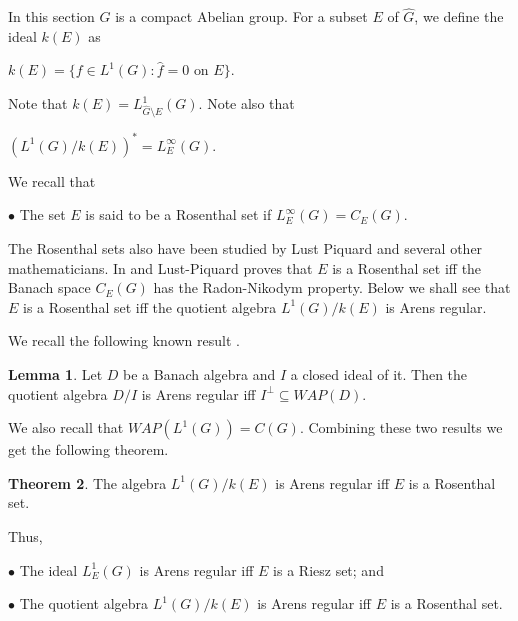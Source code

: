 \documentclass[12pt, twoside, leqno]{article}
\theoremstyle{definition}
\newtheorem{theorem}{Theorem}[section]
\newtheorem{lemma}[theorem]{Lemma}
\theoremstyle{definition}
\numberwithin{equation}{section}
\begin{document}
 In this section $ G $ is a compact Abelian group. For a subset $ E $ of $ \hat{G} $, we define the ideal $ k(E) $ as \vspace{2mm}
 
 $ k(E)=\{f\in L^{1}(G):\hat{f}=0 \text{ on } E\} $. \vspace{2mm}
 
 \noindent Note that $ k(E)=L^{1}_{\hat{G}\setminus E}(G) $. Note also that \vspace{2mm}
 
 $ (L^{1}(G)/k(E))^{*}=L^{\infty}_{E}(G) $.\vspace{2mm}
 
 \noindent We recall that\vspace{2mm}
 
 $\bullet$ The set $ E $ is said to be a Rosenthal set if $ L^{\infty}_{E}(G)=C_{E}(G) $.\vspace{2mm}
 
 The Rosenthal sets also have been studied by Lust Piquard and several other mathematicians. In \cite {lust_piq_01} and \cite {lust_piq_02} Lust-Piquard proves that $ E $ is a Rosenthal set iff the Banach space $ C_{E}(G) $ has the Radon-Nikodym property. Below we shall see that $ E $ is a Rosenthal set iff the quotient algebra $ L^{1}(G)/k(E) $ is Arens regular.\vspace{2mm}
 
  We recall the following known result \cite [Corollary 2.3.34]{dales_ulger_02}.
 
 \begin{lemma}
 	Let $ D $ be a Banach algebra and $ I $ a closed ideal of it. Then the quotient algebra $ D/I $ is Arens regular iff $ I^{\perp}\subseteq WAP(D) $.
 \end{lemma} 
We also recall that $ WAP(L^{1}(G))=C(G) $. Combining these two results we get the following theorem.\vspace{2mm}

\begin{theorem} The algebra $ L^{1}(G)/k(E) $ is Arens regular iff $ E $ is a Rosenthal set.	
\end{theorem} 
Thus,\vspace{2mm}
 
$\bullet$ The ideal $ L^{1}_{E}(G) $ is Arens regular iff $ E $ is a Riesz set; and\vspace{2mm} 

$\bullet$ The quotient algebra $ L^{1}(G)/k(E) $  is Arens regular iff $ E $ is a Rosenthal set.
\end{document}
